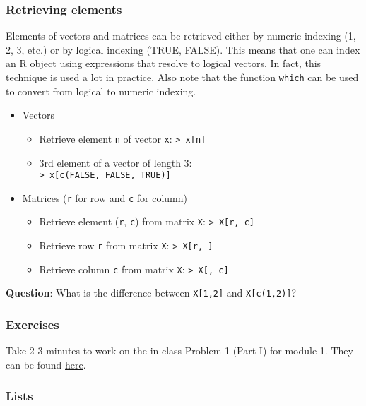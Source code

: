 \documentclass{beamer}
\begin{document}
\begin{frame}
    \frametitle{Retrieving elements}
    Elements of vectors and matrices can be retrieved either by numeric indexing (1, 2, 3, etc.)
    or by logical indexing (TRUE, FALSE).
    This means that one can index an R object using expressions that resolve to logical vectors.
    In fact, this technique is used a lot in practice.
    \pause
    Also note that the function \texttt{which} can be used to convert from logical to numeric indexing.
    \pause
    \begin{itemize}
      \item Vectors
      \pause
        \begin{itemize}
          \item Retrieve element \texttt{n} of vector \texttt{x}: \texttt{> x[n]}
          \pause
          \item 3rd element of a vector of length 3:\\ \texttt{> x[c(FALSE, FALSE, TRUE)]}
          \pause
        \end{itemize}
      \item Matrices (\texttt{r} for row and \texttt{c} for column)
      \pause
        \begin{itemize}
          \item Retrieve element (\texttt{r}, \texttt{c}) from matrix \texttt{X}: \texttt{> X[r, c]}
          \pause
          \item Retrieve row \texttt{r} from matrix \texttt{X}: \texttt{> X[r, ]}
          \pause
          \item Retrieve column \texttt{c} from matrix \texttt{X}: \texttt{> X[, c]}
        \end{itemize}
    \end{itemize}
    \pause
    \textbf{Question}: What is the difference between \texttt{X[1,2]} and \texttt{X[c(1,2)]}?
\end{frame}


\begin{frame}
    \frametitle{Exercises}
    Take 2-3 minutes to work on the in-class Problem 1 (Part I) for module 1.
    They can be found \href{https://github.com/rnitulescu/RcourseOncology2021/blob/master/exercises1.R}{here}.
\end{frame}


\begin{frame}[fragile]
    \frametitle{Lists}
    \fontsize{11pt}{10}\selectfont
    
\end{frame}
\end{document}
